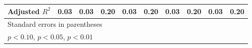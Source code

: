 \begin{table}[htbp]
\begin{tabular}{l*{9}{c}}
Adjusted \(R^{2}\)&     0.03         &     0.03         &     0.20         &     0.03         &     0.20         &     0.03         &     0.20         &     0.03         &     0.20         \\
\hline\hline
\multicolumn{10}{l}{\footnotesize Standard errors in parentheses}\\
\multicolumn{10}{l}{\footnotesize \sym{*} \(p<0.10\), \sym{**} \(p<0.05\), \sym{***} \(p<0.01\)}\\
\end{tabular}
\end{table}

